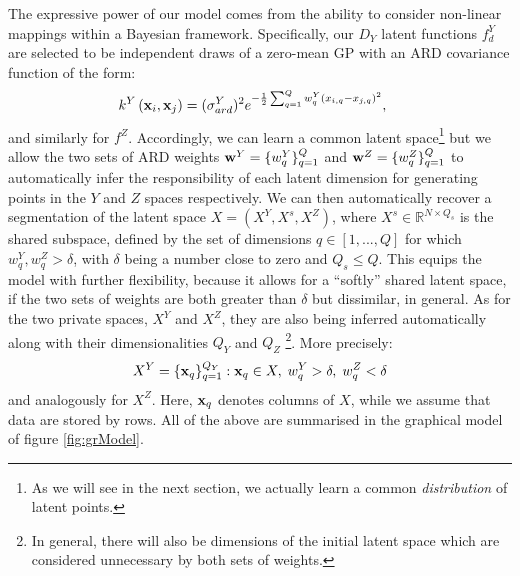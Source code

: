 %
%
%
%
The expressive power of our model comes from the ability to consider
non-linear mappings within a Bayesian framework.  Specifically, our
$D_Y$ latent functions $f^Y_d$ are selected to be independent draws of
a zero-mean GP with an ARD covariance function of the form:
\begin{align}
  k^Y \left( \mathbf{x}_i, \mathbf{x}_j \right) = {} & (\sigma_{ard}^Y)^2 e^{ -
    \frac{1}{2} \sum_{q=1}^{Q} w^Y_q \left( x_{i,q} - x_{j,q} \right)
    ^2 },
\label{ARDkernel}
\end{align}
and similarly for $f^Z$. Accordingly, we can learn a common latent
space\footnote{As we will see in the next section, we actually learn a
  common \emph{distribution} of latent points.}
but we allow the two sets of ARD weights $\mathbf{w}^Y = \{ w_q^Y
\}_{q=1}^Q$ and $\mathbf{w}^Z = \{ w_q^Z \}_{q=1}^Q$ to automatically infer
the responsibility of each latent dimension for generating points in
the $Y$ and $Z$ spaces respectively.  We can then automatically
recover a segmentation of the latent space $X = \left( X^Y, X^s, X^Z
\right)$, where $X^s \in \mathbb{R}^{N \times Q_s}$ is the shared
subspace, defined by the set of dimensions $q \in [1, ... ,Q]$ for
which $w^Y_q, w^Z_q > \delta$, with $\delta$ being a number close
to zero and $Q_s \leq Q$. This equips the model with further
flexibility, because it allows for a ``softly'' shared latent space,
if the two sets of weights are both greater than $\delta$ but
dissimilar, in general.  As for the two private spaces, $X^Y$ and
$X^Z$, they are also being inferred automatically along with their
dimensionalities $Q_Y$ and $Q_Z$ \footnote{In general, there will also
  be dimensions of the initial latent space which are considered
  unnecessary by both sets of weights. 
  }.
%
More precisely:
\begin{equation}
  X^Y = \{ \mathbf{x}_q \}_{q=1}^{Q_Y}: \mathbf{x}_q \in X, \; w^Y_q > \delta, \;  w^Z_q < \delta
\end{equation}
and analogously for $X^Z$. Here, $\mathbf{x}_q$ denotes columns of $X$,
while we assume that data are stored by rows.  All of the above are
summarised in the graphical model of figure \ref{fig:grModel}.
%


